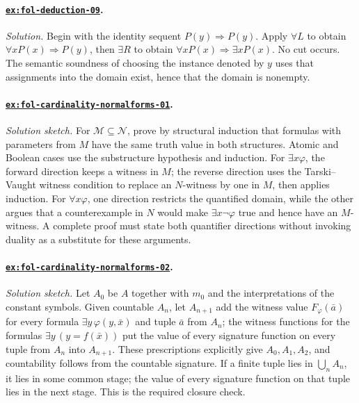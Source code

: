 \paragraph{\hyperref[ex:fol-deduction-09]{\texttt{ex:fol-deduction-09}}.}
\textit{Solution.}  Begin with the identity sequent \(P(y)\Rightarrow P(y)\).
Apply \(\forall L\) to obtain \(\forall xP(x)\Rightarrow P(y)\), then
\(\exists R\) to obtain
\(\forall xP(x)\Rightarrow\exists xP(x)\).  No cut occurs.  The semantic
soundness of choosing the instance denoted by \(y\) uses that assignments into
the domain exist, hence that the domain is nonempty.

\paragraph{\hyperref[ex:fol-cardinality-normalforms-01]{\texttt{ex:fol-cardinality-normalforms-01}}.}
\textit{Solution sketch.}  For \(\mathcal M\subseteq\mathcal N\), prove by
structural induction that formulas with parameters from \(M\) have the same
truth value in both structures.  Atomic and Boolean cases use the substructure
hypothesis and induction.  For \(\exists x\varphi\), the forward direction
keeps a witness in \(M\); the reverse direction uses the Tarski--Vaught witness
condition to replace an \(N\)-witness by one in \(M\), then applies induction.
For \(\forall x\varphi\), one direction restricts the quantified domain, while
the other argues that a counterexample in \(N\) would make
\(\exists x\neg\varphi\) true and hence have an \(M\)-witness.  A complete
proof must state both quantifier directions without invoking duality as a
substitute for these arguments.

\paragraph{\hyperref[ex:fol-cardinality-normalforms-02]{\texttt{ex:fol-cardinality-normalforms-02}}.}
\textit{Solution sketch.}  Let \(A_0\) be \(A\) together with \(m_0\)
and the interpretations of the constant symbols.  Given countable
\(A_n\), let \(A_{n+1}\) add the witness value \(F_\varphi(\bar a)\) for
every formula \(\exists y\,\varphi(y,\bar x)\) and tuple \(\bar a\) from
\(A_n\); the witness functions for the formulas
\(\exists y\,(y=f(\bar x))\) put the value of every signature function on
every tuple from \(A_n\) into \(A_{n+1}\).  These prescriptions explicitly
give \(A_0,A_1,A_2\), and countability follows from the countable signature.
If a finite tuple lies in \(\bigcup_nA_n\), it lies in some common stage; the
value of every signature function on that tuple lies in the next stage.  This
is the required closure check.

